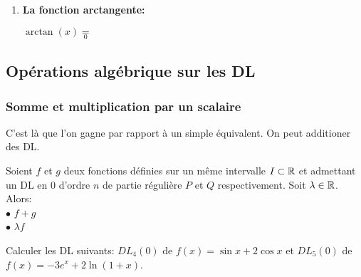 \documentclass[a4paper, 11pt]{article}
\begin{document}
{\begin{enumerate}
\begin{dboxminipage}{0.7 \textwidth}

\begin{itemize}
\item[$\bullet$] $\ln{(1+x)}\underset{0}{=} $\vsec
\item[$\bullet$] $\ln{(1-x)}\underset{0}{=} $
\end{itemize}
\end{dboxminipage}




\item \textbf{\large{La fonction arctangente:}}\vsec
 
\begin{dboxminipage}{0.7 \textwidth}

$\arctan(x)\underset{0}{=} $
\end{dboxminipage}



\end{enumerate} 
 
\subsection{Op\'erations algébrique sur les DL}

\subsubsection{Somme et multiplication par un scalaire}
C'est là que l'on gagne par rapport à un simple équivalent. On peut additioner des DL. 
\begin{prop} 
Soient $f$ et $g$ deux fonctions d\'efinies sur un m\^eme intervalle $I\subset \mathbb{R}$ et admettant un DL en 0 d'ordre $n$ de partie r\'eguli\`ere $P$ et $Q$ respectivement. Soit $\lambda\in \mathbb{R}$. Alors:\vsec\\
\noindent $\bullet$ $f+g$\dotfill\vsec\\
$\bullet$ $\lambda f$ \dotfill\vsec
\end{prop}
 


{\footnotesize \begin{exercice} Calculer les DL suivants: $DL_4(0)$ de $f(x)=\sin{x}+2\cos{x}$ et $DL_5(0)$ de $f(x)=-3e^x+2\ln{(1+x)}$.
\end{exercice}
}

}
\end{document}
